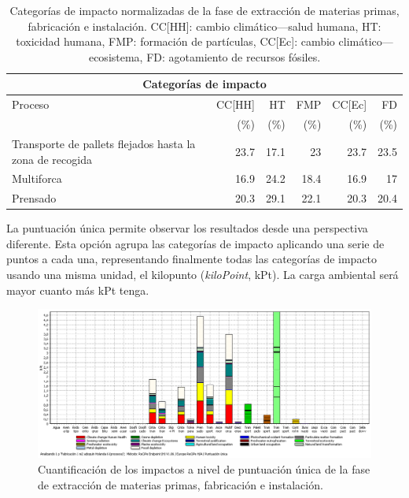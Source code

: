 \begin{table}[!htb]
\centering
\begin{tabular}{p{4cm}rrrrr}
\toprule
\multicolumn{6}{c}{Categorías de impacto}\\
\midrule
Proceso & CC[HH] & HT & FMP & CC[Ec] & FD\\
 &  (\%) & (\%) & (\%) & (\%) & (\%)\\
\midrule
Transporte de pallets flejados hasta la zona de recogida & 23.7 & 17.1 & 23 & 23.7 & 23.5\\
Multiforca & 16.9 & 24.2 & 18.4 & 16.9 & 17\\
Prensado & 20.3 & 29.1 & 22.1 & 20.3 & 20.4\\
\bottomrule
\end{tabular}
\caption[Categorías de impacto normalizadas de la fase de extracción de materias primas, fabricación e instalación.]{Categorías de impacto normalizadas de la fase de extracción de materias primas, fabricación e instalación. CC[HH]: cambio climático—salud humana, HT: toxicidad humana, FMP: formación de partículas, CC[Ec]: cambio climático—ecosistema, FD: agotamiento de recursos fósiles.}
\label{categoriasimpactofabricacion}
\end{table}

La puntuación única permite observar los resultados desde una perspectiva diferente. Esta opción agrupa las categorías de impacto aplicando una serie de puntos a cada una, representando finalmente todas las categorías de impacto usando una misma unidad, el kilopunto (\textit{kiloPoint}, kPt). La carga ambiental será mayor cuanto más kPt tenga.

\begin{figure}[!htb]
\centering
\includegraphics[width=15cm]{img/fabric_puntuacionunica.png}
\caption{Cuantificación de los impactos a nivel de puntuación única de la fase de extracción de materias primas, fabricación e instalación.}
\label{fig:fabric_puntuacionunica}
\end{figure}

